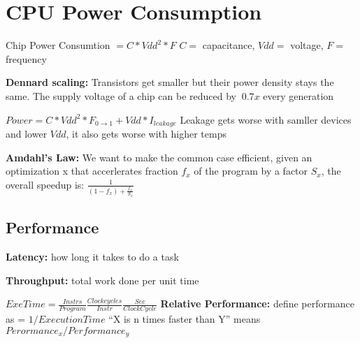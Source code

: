 \section{CPU Power Consumption}

Chip Power Consumtion $= C*Vdd^2*F$
$C =$ capacitance, $Vdd = $ voltage, $F =$ frequency

\textbf{Dennard scaling:} Transistors get smaller but their power density stays
the same. The supply voltage of a chip can be reduced by $~0.7x$ every generation

$Power = C*Vdd^2*F_{0\rightarrow 1}+Vdd*I_{leakage}$
Leakage gets worse with samller devices and lower $Vdd$, it also gets worse with
higher temps

\textbf{Amdahl's Law:} We want to make the common case efficient, given an optimization x that
accerlerates fraction $f_x$ of the program by a factor $S_x$, the overall
speedup is:
$\frac{1}{(1-f_x)+\frac{f_x}{S_x}}$

\subsection*{Performance}
\textbf{Latency:} how long it takes to do a task

\textbf{Throughput:} total work done per unit time

$ExeTime = \frac{Instrs}{Program}\frac{Clock cycles}{Instr}\frac{Sec}{ClockCycle}$
\textbf{Relative Performance:} define performance as = $1/ExecutionTime$
``X is n times faster than Y'' means $Perormance_x/Performance_y$
